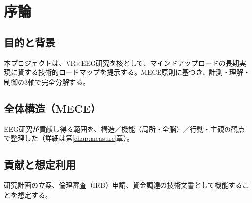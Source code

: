 \chapter{序論}
\section{目的と背景}
本プロジェクトは、VR×EEG研究を核として、マインドアップロードの長期実現に資する技術的ロードマップを提示する。MECE原則に基づき、計測・理解・制御の3軸で完全分解する。

\section{全体構造（MECE）}
EEG研究が貢献し得る範囲を、構造／機能（局所・全脳）／行動・主観の観点で整理した（詳細は第\ref{chap:measure}章）。

\section{貢献と想定利用}
研究計画の立案、倫理審査（IRB）申請、資金調達の技術文書として機能することを想定する。


